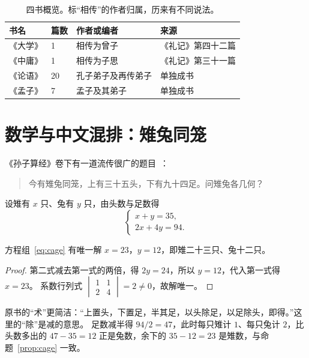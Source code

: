 \begin{table}[htbp]
  \centering
  \caption{四书概览。标“相传”的作者归属，历来有不同说法。}\label{tab:sishu}
  \begin{tabular}{llll}
    \toprule
    书名 & 篇数 & 作者或编者 & 来源 \\
    \midrule
    《大学》 & 1 & 相传为曾子 & 《礼记》第四十二篇 \\
    《中庸》 & 1 & 相传为子思 & 《礼记》第三十一篇 \\
    《论语》 & 20 & 孔子弟子及再传弟子 & 单独成书 \\
    《孟子》 & 7 & 孟子及其弟子 & 单独成书 \\
    \bottomrule
  \end{tabular}
\end{table}

\section{数学与中文混排：雉兔同笼}\label{sec:math}
《孙子算经》卷下有一道流传很广的题目~\cite{qian1963}：
\begin{quote}
今有雉兔同笼，上有三十五头，下有九十四足。问雉兔各几何？
\end{quote}
设雉有 $x$ 只、兔有 $y$ 只，由头数与足数得
\begin{equation}\label{eq:cage}
  \begin{cases} x + y = 35, \\ 2x + 4y = 94. \end{cases}
\end{equation}

\begin{proposition}[雉兔同笼]\label{prop:cage}
方程组~\eqref{eq:cage} 有唯一解 $x = 23$，$y = 12$，即雉二十三只、兔十二只。
\end{proposition}

\begin{proof}
第二式减去第一式的两倍，得 $2y = 24$，所以 $y = 12$，代入第一式得 $x = 23$。
系数行列式 $\begin{vmatrix} 1 & 1 \\ 2 & 4 \end{vmatrix} = 2 \neq 0$，故解唯一。
\end{proof}

原书的“术”更简洁：“上置头，下置足，半其足，以头除足，以足除头，即得。”这里的“除”是减的意思。
足数减半得 $94 / 2 = 47$，此时每只雉计 $1$、每只兔计 $2$，比头数多出的 $47 - 35 = 12$ 正是兔数，余下的 $35 - 12 = 23$ 是雉数，与命题~\ref{prop:cage} 一致。

